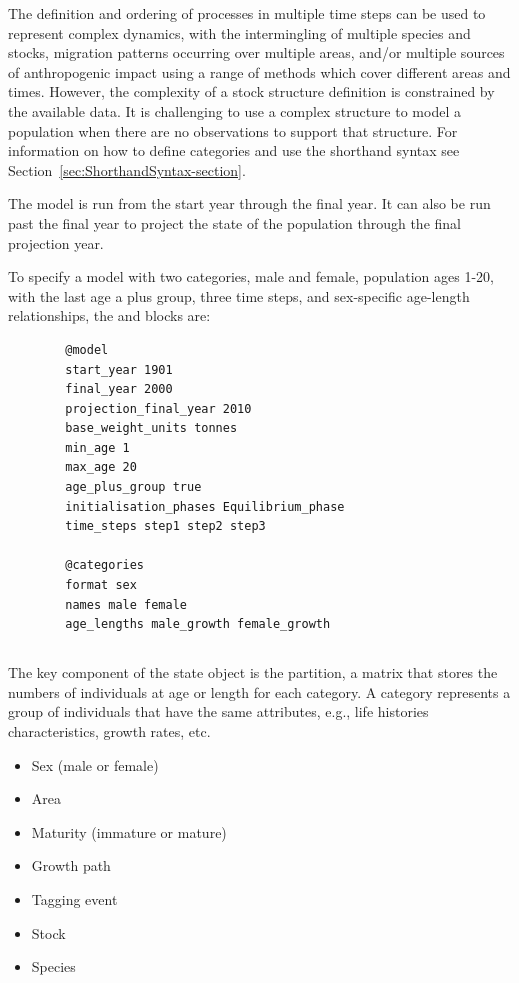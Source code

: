 The definition and ordering of processes in multiple time steps can be used to represent complex dynamics, with the intermingling of multiple species and stocks, migration patterns occurring over multiple areas, and/or multiple sources of anthropogenic impact using a range of methods which cover different areas and times. However, the complexity of a stock structure definition is constrained by the available data. It is challenging to use a complex structure to model a population when there are no observations to support that structure.  For information on how to define categories and use the shorthand syntax see Section~\ref{sec:ShorthandSyntax-section}.

The model is run from the start year through the final year. It can also be run past the final year to project the state of the population through the final projection year.

To specify a model with two categories, male and female, population ages 1-20, with the last age a plus group, three time steps, and sex-specific age-length relationships, the  and  blocks are:

{\small{\begin{verbatim}
		@model
		start_year 1901
		final_year 2000
		projection_final_year 2010
		base_weight_units tonnes
		min_age 1
		max_age 20
		age_plus_group true
		initialisation_phases Equilibrium_phase
		time_steps step1 step2 step3
		
		@categories
		format sex
		names male female
		age_lengths male_growth female_growth
\end{verbatim}}}

\subsection{}

The key component of the state object is the partition, a matrix that stores the numbers of individuals at age or length for each category. A category represents a group of individuals that have the same attributes, e.g., life histories characteristics, growth rates, etc.

\begin{itemize}
\item Sex (male or female)
\item Area
\item Maturity (immature or mature)
\item Growth path
\item Tagging event
\item Stock
\item Species
\end{itemize}

